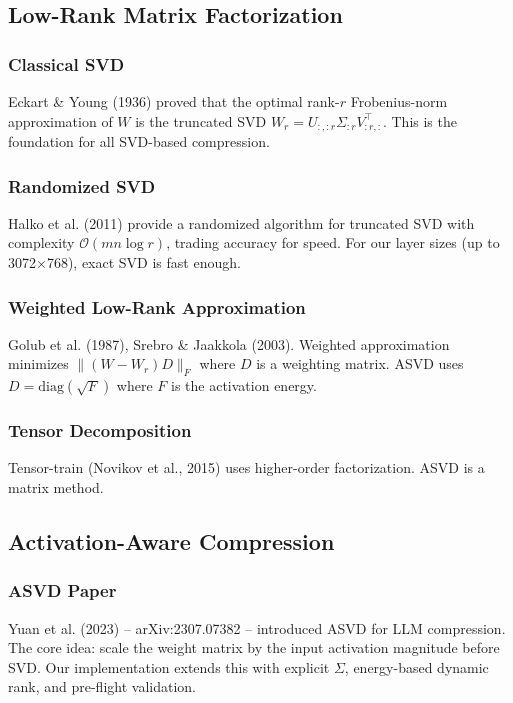 \subsection{Low-Rank Matrix Factorization}

\subsubsection{Classical SVD}

Eckart \& Young (1936) proved that the optimal rank-$r$ Frobenius-norm 
approximation of $W$ is the truncated SVD $W_r = U_{:, :r} \Sigma_{:r} V_{:r, :}^\top$. 
This is the foundation for all SVD-based compression.

\subsubsection{Randomized SVD}

Halko et al. (2011) provide a randomized algorithm for truncated SVD with 
complexity $\mathcal{O}(mn \log r)$, trading accuracy for speed. For our 
layer sizes (up to 3072$\times$768), exact SVD is fast enough.

\subsubsection{Weighted Low-Rank Approximation}

Golub et al. (1987), Srebro \& Jaakkola (2003). Weighted approximation 
minimizes $\|(W - W_r) D\|_F$ where $D$ is a weighting matrix. ASVD uses 
$D = \text{diag}(\sqrt{F})$ where $F$ is the activation energy.

\subsubsection{Tensor Decomposition}

Tensor-train (Novikov et al., 2015) uses higher-order factorization. 
ASVD is a matrix method.

\subsection{Activation-Aware Compression}

\subsubsection{ASVD Paper}

Yuan et al. (2023) -- arXiv:2307.07382 -- introduced ASVD for LLM 
compression. The core idea: scale the weight matrix by the input activation 
magnitude before SVD. Our implementation extends this with explicit $\Sigma$, 
energy-based dynamic rank, and pre-flight validation.

